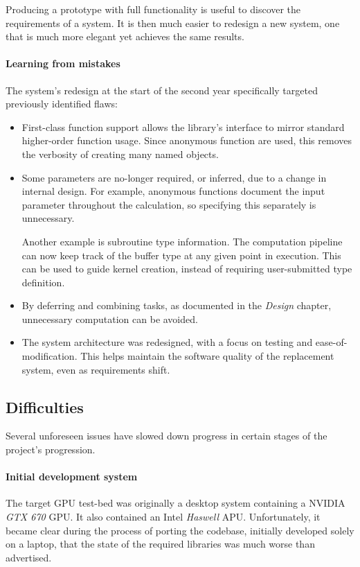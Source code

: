 Producing a prototype with full functionality is useful to discover the requirements of a system. It is then much easier to redesign a new system, one that is much more elegant yet achieves the same results.

\paragraph*{Learning from mistakes}
The system's redesign at the start of the second year specifically targeted previously identified flaws:
\begin{itemize}
    \item First-class function support allows the library's interface to mirror standard higher-order function usage. Since anonymous function are used, this removes the verbosity of creating many named objects.

    \item Some parameters are no-longer required, or inferred, due to a change in internal design. For example, anonymous functions document the input parameter throughout the calculation, so specifying this separately is unnecessary.

      Another example is subroutine type information. The computation pipeline can now keep track of the buffer type at any given point in execution. This can be used to guide kernel creation, instead of requiring user-submitted type definition.

    \item By deferring and combining tasks, as documented in the \emph{Design} chapter, unnecessary computation can be avoided.

    \item The system architecture was redesigned, with a focus on testing and ease-of-modification. This helps maintain the software quality of the replacement system, even as requirements shift.
\end{itemize}

\subsection{Difficulties}
Several unforeseen issues have slowed down progress in certain stages of the project's progression.

\paragraph*{Initial development system}
The target \ac{GPU} test-bed was originally a desktop system containing a NVIDIA \emph{GTX 670} \ac{GPU}. It also contained an Intel \emph{Haswell} \ac{APU}. Unfortunately, it became clear during the process of porting the codebase, initially developed solely on a laptop, that the state of the required libraries was much worse than advertised.

